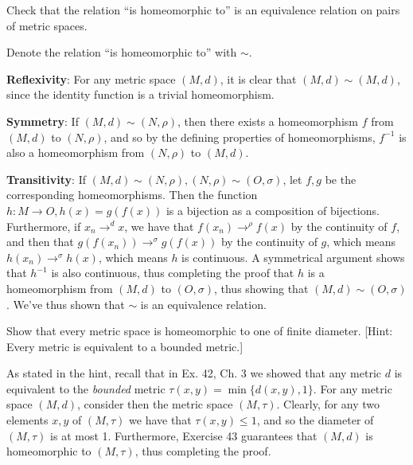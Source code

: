 \begin{exercise}{44}
    Check that the relation ``is homeomorphic to'' is an equivalence relation on pairs of metric spaces.
\end{exercise}

\begin{solution}
    
    Denote the relation ``is homeomorphic to'' with $\sim$.
    
    \textbf{Reflexivity}: For any metric space $(M, d)$, it is clear that $(M, d) \sim (M, d)$, since the identity function is a trivial homeomorphism.

    \textbf{Symmetry}: If $(M, d) \sim (N, \rho)$, then there exists a homeomorphism $f$ from $(M, d)$ to $(N, \rho)$, and so by the defining properties of homeomorphisms, $f^{-1}$ is also a homeomorphism from $(N, \rho)$ to $(M, d)$.

    \textbf{Transitivity}: If $(M, d) \sim (N, \rho), (N, \rho) \sim (O, \sigma)$, let $f, g$ be the corresponding homeomorphisms.
    Then the function $h: M \rightarrow O, h(x) = g(f(x))$ is a bijection as a composition of bijections.
    Furthermore, if $x_n \rightarrow^{d} x$, we have that $f(x_n) \rightarrow^{\rho} f(x)$ by the continuity of $f$, and then that $g(f(x_n)) \rightarrow^{\sigma} g(f(x))$ by the continuity of $g$, which means $h(x_n) \rightarrow^{\sigma} h(x)$, which means $h$ is continuous.
    A symmetrical argument shows that $h^{-1}$ is also continuous, thus completing the proof that $h$ is a homeomorphism from $(M, d)$ to $(O, \sigma)$, thus showing that $(M, d) \sim (O, \sigma)$.
    We've thus shown that $\sim$ is an equivalence relation.
\end{solution}

\begin{exercise}{46}
    Show that every metric space is homeomorphic to one of finite diameter.
    [Hint: Every metric is equivalent to a bounded metric.]
\end{exercise}

\begin{solution}
    
    As stated in the hint, recall that in Ex. 42, Ch. 3 we showed that any metric $d$ is equivalent to the \textit{bounded} metric $\tau(x, y) = \min\{d(x, y), 1\}$.
    For any metric space $(M, d)$, consider then the metric space $(M, \tau)$.
    Clearly, for any two elements $x, y$ of $(M, \tau)$ we have that $\tau(x, y) \leq 1$, and so the diameter of $(M, \tau)$ is at most 1.
    Furthermore, Exercise 43 guarantees that $(M, d)$ is homeomorphic to $(M, \tau)$, thus completing the proof.
\end{solution}

